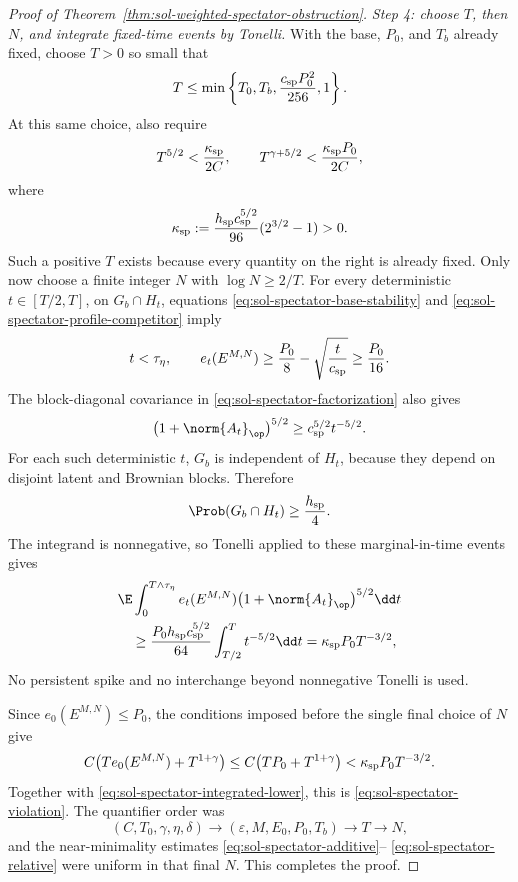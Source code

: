 \documentclass[../main.tex]{subfiles}
\begin{document}
\begin{proof}[Proof of Theorem~\ref{thm:sol-weighted-spectator-obstruction}]
\emph{Step 4: choose $T$, then $N$, and integrate fixed-time events by Tonelli.}
With the base, $P_0$, and $T_b$ already fixed, choose $T>0$ so small that
\begin{equation}
  T\le\min\left\{T_0,T_b,\frac{c_{\rm sp}P_0^2}{256},1\right\}.
  \label{eq:sol-spectator-T-first}
\end{equation}
At this same choice, also require
\begin{equation}
  T^{5/2}<\frac{\kappa_{\rm sp}}{2C},
  \qquad
  T^{\gamma+5/2}<\frac{\kappa_{\rm sp}P_0}{2C},
  \label{eq:sol-spectator-final-T}
\end{equation}
where
\[
  \kappa_{\rm sp}
  :=\frac{h_{\rm sp}c_{\rm sp}^{5/2}}{96}
       (2^{3/2}-1)>0.
\]
Such a positive $T$ exists because every quantity on the right is already fixed.
Only now choose a finite integer $N$ with $\log N\ge2/T$.  For every deterministic
$t\in[T/2,T]$, on $G_b\cap H_t$, equations
\eqref{eq:sol-spectator-base-stability} and
\eqref{eq:sol-spectator-profile-competitor} imply
\begin{equation}
  t<\tau_\eta,
  \qquad
  e_t(E^{M,N})\ge\frac{P_0}{8}-\sqrt{\frac{t}{c_{\rm sp}}}
  \ge\frac{P_0}{16}.
  \label{eq:sol-spectator-excess-lower}
\end{equation}
The block-diagonal covariance in \eqref{eq:sol-spectator-factorization} also gives
\begin{equation}
  \bigl(1+\norm{A_t}_\op\bigr)^{5/2}
  \ge c_{\rm sp}^{5/2}t^{-5/2}.
  \label{eq:sol-spectator-weight-lower}
\end{equation}
For each such deterministic $t$, $G_b$ is independent of $H_t$, because they depend on
disjoint latent and Brownian blocks.  Therefore
\[
  \Prob(G_b\cap H_t)\ge\frac{h_{\rm sp}}4.
\]
The integrand is nonnegative, so Tonelli applied to these marginal-in-time events gives
\begin{align}
  &\E\int_0^{T\wedge\tau_\eta}
     e_t(E^{M,N})\bigl(1+\norm{A_t}_\op\bigr)^{5/2}\dd t
  \notag\\
  &\quad\ge
  \frac{P_0h_{\rm sp}c_{\rm sp}^{5/2}}{64}
  \int_{T/2}^Tt^{-5/2}\dd t
  =\kappa_{\rm sp}P_0T^{-3/2},
  \label{eq:sol-spectator-integrated-lower}
\end{align}
No persistent spike and no interchange beyond nonnegative Tonelli is used.

Since $e_0(E^{M,N})\le P_0$, the conditions imposed before the single final choice of $N$ give
\[
  C\bigl(Te_0(E^{M,N})+T^{1+\gamma}\bigr)
  \le C\bigl(TP_0+T^{1+\gamma}\bigr)
  <\kappa_{\rm sp}P_0T^{-3/2}.
\]
Together with \eqref{eq:sol-spectator-integrated-lower}, this is
\eqref{eq:sol-spectator-violation}.  The quantifier order was
\[
  (C,T_0,\gamma,\eta,\delta)
  \longrightarrow(\varepsilon,M,E_0,P_0,T_b)
  \longrightarrow T
  \longrightarrow N,
\]
and the near-minimality estimates \eqref{eq:sol-spectator-additive}--
\eqref{eq:sol-spectator-relative} were uniform in that final $N$.  This completes the proof.
\end{proof}
\end{document}
